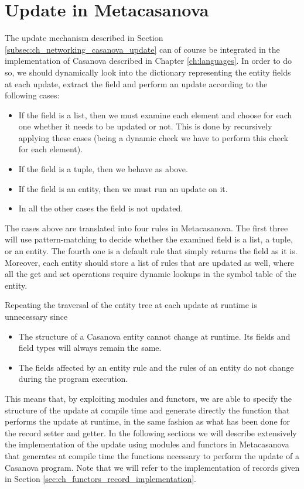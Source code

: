 \section{Update in Metacasanova}
\label{subsec:ch_networking_update_metacasanova}
The update mechanism described in Section \ref{subsec:ch_networking_casanova_update} can of course be integrated in the implementation of Casanova described in Chapter \ref{ch:languages}. In order to do so, we should dynamically look into the dictionary representing the entity fields at each update, extract the field and perform an update according to the following cases:

\begin{itemize}[noitemsep]
	\item If the field is a list, then we must examine each element and choose for each one whether it needs to be updated or not. This is done by recursively applying these cases (being a dynamic check we have to perform this check for each element).
	\item If the field is a tuple, then we behave as above.
	\item If the field is an entity, then we must run an update on it.
	\item In all the other cases the field is not updated.
\end{itemize}

\noindent
The cases above are translated into four rules in Metacasanova. The first three will use pattern-matching to decide whether the examined field is a list, a tuple, or an entity. The fourth one is a default rule that simply returns the field as it is. Moreover, each entity should store a list of rules that are updated as well, where all the get and set operations require dynamic lookups in the symbol table of the entity.

Repeating the traversal of the entity tree at each update at runtime is unnecessary since

\begin{itemize}[noitemsep]
	\item The structure of a Casanova entity cannot change at runtime. Its fields and field types will always remain the same.
	\item The fields affected by an entity rule and the rules of an entity do not change during the program execution.
\end{itemize}

\noindent
This means that, by exploiting modules and functors, we are able to specify the structure of the update at compile time and generate directly the function that performs the update at runtime, in the same fashion as what has been done for the record setter and getter. In the following sections we will describe extensively the implementation of the update using modules and functors in Metacasanova that generates at compile time the functions necessary to perform the update of a Casanova program. Note that we will refer to the implementation of records given in Section \ref{sec:ch_functors_record_implementation}.

